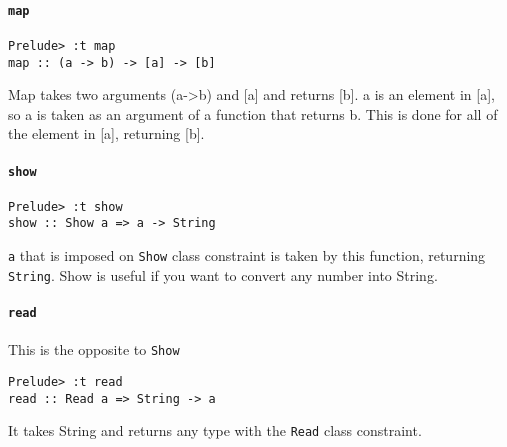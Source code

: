 \paragraph{\lstinline{map}}
\begin{lstlisting}
Prelude> :t map
map :: (a -> b) -> [a] -> [b]
\end{lstlisting}

Map takes two arguments (a->b) and [a] and returns [b]. a is an element in [a], so a is taken as an argument of a function that returns b. This is done for all of the element in [a], returning [b].

\paragraph{{\lstinline{show}}}
\begin{lstlisting}
Prelude> :t show
show :: Show a => a -> String
\end{lstlisting}

\lstinline{a} that is imposed on \lstinline{Show} class constraint is taken by this function, returning \lstinline{String}. Show is useful if you want to convert any number into String.

\paragraph{\lstinline{read}}
This is the opposite to \lstinline{Show}
\begin{lstlisting}
Prelude> :t read
read :: Read a => String -> a
\end{lstlisting}

It takes String and returns any type with the \lstinline{Read} class constraint.  
